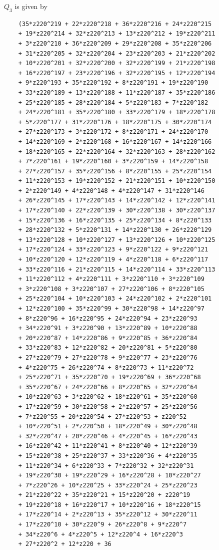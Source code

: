 \documentclass{scrartcl}
\theoremstyle{definition}
\begin{document}
$Q_3$ is given by
\begin{lstlisting}
    (35*z220^219 + 22*z220^218 + 36*z220^216 + 24*z220^215 
    + 19*z220^214 + 32*z220^213 + 13*z220^212 + 19*z220^211 
    + 3*z220^210 + 36*z220^209 + 29*z220^208 + 35*z220^206 
    + 31*z220^205 + 32*z220^204 + 23*z220^203 + 21*z220^202 
    + 10*z220^201 + 32*z220^200 + 32*z220^199 + 21*z220^198 
    + 16*z220^197 + 23*z220^196 + 32*z220^195 + 12*z220^194 
    + 9*z220^193 + 35*z220^192 + 8*z220^191 + 19*z220^190 
    + 33*z220^189 + 13*z220^188 + 11*z220^187 + 35*z220^186 
    + 25*z220^185 + 28*z220^184 + 5*z220^183 + 7*z220^182 
    + 24*z220^181 + 35*z220^180 + 33*z220^179 + 18*z220^178 
    + 5*z220^177 + 31*z220^176 + 18*z220^175 + 30*z220^174 
    + 27*z220^173 + 3*z220^172 + 8*z220^171 + 24*z220^170 
    + 14*z220^169 + 2*z220^168 + 16*z220^167 + 14*z220^166 
    + 18*z220^165 + 22*z220^164 + 32*z220^163 + 28*z220^162 
    + 7*z220^161 + 19*z220^160 + 3*z220^159 + 14*z220^158 
    + 27*z220^157 + 35*z220^156 + 8*z220^155 + 25*z220^154 
    + 11*z220^153 + 19*z220^152 + 21*z220^151 + 10*z220^150 
    + 2*z220^149 + 4*z220^148 + 4*z220^147 + 31*z220^146 
    + 26*z220^145 + 17*z220^143 + 14*z220^142 + 12*z220^141 
    + 17*z220^140 + 22*z220^139 + 30*z220^138 + 30*z220^137 
    + 15*z220^136 + 16*z220^135 + 25*z220^134 + 8*z220^133 
    + 28*z220^132 + 5*z220^131 + 14*z220^130 + 26*z220^129 
    + 13*z220^128 + 10*z220^127 + 13*z220^126 + 10*z220^125 
    + 17*z220^124 + 33*z220^123 + 9*z220^122 + 9*z220^121 
    + 10*z220^120 + 12*z220^119 + 4*z220^118 + 6*z220^117 
    + 33*z220^116 + 21*z220^115 + 14*z220^114 + 33*z220^113 
    + 11*z220^112 + 4*z220^111 + 3*z220^110 + 3*z220^109 
    + 3*z220^108 + 3*z220^107 + 27*z220^106 + 8*z220^105 
    + 25*z220^104 + 10*z220^103 + 24*z220^102 + 2*z220^101 
    + 12*z220^100 + 35*z220^99 + 30*z220^98 + 14*z220^97 
    + 8*z220^96 + 16*z220^95 + 24*z220^94 + 23*z220^93 
    + 34*z220^91 + 3*z220^90 + 13*z220^89 + 10*z220^88 
    + 20*z220^87 + 14*z220^86 + 9*z220^85 + 36*z220^84 
    + 33*z220^83 + 12*z220^82 + 20*z220^81 + 5*z220^80 
    + 27*z220^79 + 27*z220^78 + 9*z220^77 + 23*z220^76 
    + 4*z220^75 + 26*z220^74 + 8*z220^73 + 11*z220^72 
    + 25*z220^71 + 35*z220^70 + 19*z220^69 + 36*z220^68 
    + 35*z220^67 + 24*z220^66 + 8*z220^65 + 32*z220^64 
    + 10*z220^63 + 3*z220^62 + 18*z220^61 + 35*z220^60 
    + 17*z220^59 + 30*z220^58 + 2*z220^57 + 25*z220^56 
    + 7*z220^55 + 20*z220^54 + 27*z220^53 + z220^52 
    + 10*z220^51 + 2*z220^50 + 18*z220^49 + 30*z220^48 
    + 32*z220^47 + 20*z220^46 + 4*z220^45 + 16*z220^43 
    + 16*z220^42 + 11*z220^41 + 8*z220^40 + 12*z220^39 
    + 15*z220^38 + 25*z220^37 + 33*z220^36 + 4*z220^35 
    + 11*z220^34 + 6*z220^33 + 7*z220^32 + 32*z220^31 
    + 19*z220^30 + 19*z220^29 + 16*z220^28 + 10*z220^27 
    + 7*z220^26 + 10*z220^25 + 33*z220^24 + 25*z220^23 
    + 21*z220^22 + 35*z220^21 + 15*z220^20 + z220^19 
    + 19*z220^18 + 16*z220^17 + 10*z220^16 + 18*z220^15 
    + 17*z220^14 + 2*z220^13 + 35*z220^12 + 30*z220^11 
    + 17*z220^10 + 30*z220^9 + 26*z220^8 + 9*z220^7 
    + 34*z220^6 + 4*z220^5 + 12*z220^4 + 16*z220^3 
    + 27*z220^2 + 12*z220 + 36 
    

\end{lstlisting}
\end{document}
